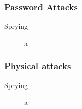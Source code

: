 \subsubsection*{\color{blue}Password Attacks}
\begin{fullwidth}
    \begin{description}
        \item[Sprying] a
    \end{description}
\end{fullwidth}

\subsubsection*{\color{red}Physical attacks}
\begin{fullwidth}
    \begin{description}
        \item[Sprying] a
    \end{description}
\end{fullwidth}